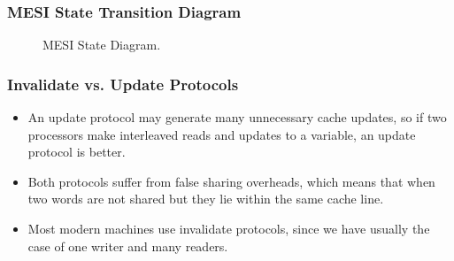 \subsubsection{MESI State Transition Diagram}
\begin{figure}[H]
  \centering
  \caption{MESI State Diagram.}
  \label{fig:mesi}
\end{figure}
\subsubsection{Invalidate vs. Update Protocols}
\begin{itemize}
\item An update protocol may generate many unnecessary cache updates, so if two processors make interleaved reads and updates to a variable, an update protocol is better.
\item Both protocols suffer from false sharing overheads, which means that when two words are not shared but they lie within the same cache line.
\item Most modern machines use invalidate protocols, since we have usually the case of one writer and many readers.
\end{itemize}

